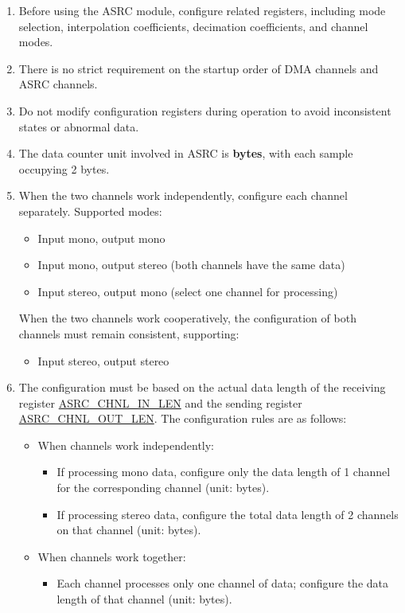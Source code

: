 \documentclass[main\_\_EN.tex]{subfiles}
\begin{document}
\begin{enumerate}
  \item Before using the ASRC module, configure related registers, including mode selection, interpolation coefficients, decimation coefficients, and channel modes.
  \item There is no strict requirement on the startup order of DMA channels and ASRC channels.
  \item Do not modify configuration registers during operation to avoid inconsistent states or abnormal data.
  \item The data counter unit involved in ASRC is \textbf{bytes}, with each sample occupying 2 bytes.

  \item When the two channels work independently, configure each channel separately. Supported modes:
  \begin{itemize}
    \item Input mono, output mono
    \item Input mono, output stereo (both channels have the same data)
    \item Input stereo, output mono (select one channel for processing)
  \end{itemize}
  When the two channels work cooperatively, the configuration of both channels must remain consistent, supporting:
  \begin{itemize}
    \item Input stereo, output stereo
  \end{itemize}

  \item The configuration must be based on the actual data length of the receiving register \hyperref[fielddesc:ASRCCHNL0INLEN]{ASRC\_CHNL\_IN\_LEN} and the sending register \hyperref[fielddesc:ASRCCHNL0OUTLEN]{ASRC\_CHNL\_OUT\_LEN}. The configuration rules are as follows:
  \begin{itemize}
    \item When channels work independently:
    \begin{itemize}
      \item If processing mono data, configure only the data length of 1 channel for the corresponding channel (unit: bytes).
      \item If processing stereo data, configure the total data length of 2 channels on that channel (unit: bytes).
    \end{itemize}
    \item When channels work together:
    \begin{itemize}
      \item Each channel processes only one channel of data; configure the data length of that channel (unit: bytes).
    \end{itemize}
  \end{itemize}


\end{enumerate}
\end{document}
